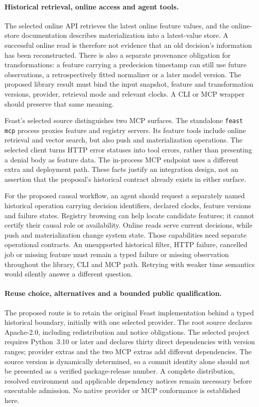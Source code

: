 \paragraph{Historical retrieval, online access and agent tools.}
The selected online API retrieves the latest online feature values, and the
online-store documentation describes materialization into a latest-value
store. A successful online read is therefore not evidence that an old
decision's information has been reconstructed. There is also a separate
provenance obligation for transformations: a feature carrying a predecision
timestamp can still use future observations, a retrospectively fitted
normalizer or a later model version. The proposed library result must bind
the input snapshot, feature and transformation versions, provider, retrieval
mode and relevant clocks. A CLI or MCP wrapper should preserve that same
meaning.\citep{exec19_feast_source}

Feast's selected source distinguishes two MCP surfaces. The standalone
\texttt{feast mcp} process proxies feature and registry servers. Its feature
tools include online retrieval and vector search, but also push and
materialization operations. The selected client turns HTTP error statuses
into tool errors, rather than presenting a denial body as feature data. The
in-process MCP endpoint uses a different extra and deployment path. These
facts justify an integration design, not an assertion that the proposal's
historical contract already exists in either surface.\citep{exec19_feast_source}

For the proposed causal workflow, an agent should request a separately named
historical operation carrying decision identifiers, declared clocks, feature
versions and failure states. Registry browsing can help locate candidate
features; it cannot certify their causal role or availability. Online reads
serve current decisions, while push and materialization change system state.
Those capabilities need separate operational contracts. An unsupported
historical filter, HTTP failure, cancelled job or missing feature must remain
a typed failure or missing observation throughout the library, CLI and MCP
path. Retrying with weaker time semantics would silently answer a different
question.

\paragraph{Reuse choice, alternatives and a bounded public qualification.}
The proposed route is to retain the original Feast implementation behind a
typed historical boundary, initially with one selected provider. The root
source declares Apache-2.0, including redistribution and notice obligations.
The selected project requires Python~3.10 or later and declares thirty direct
dependencies with version ranges; provider extras and the two MCP extras add
different dependencies. The source version is dynamically determined, so a
commit identity alone should not be presented as a verified package-release
number. A complete distribution, resolved environment and applicable
dependency notices remain necessary before executable admission. No native
provider or MCP conformance is established here.\citep{exec19_feast_source}

